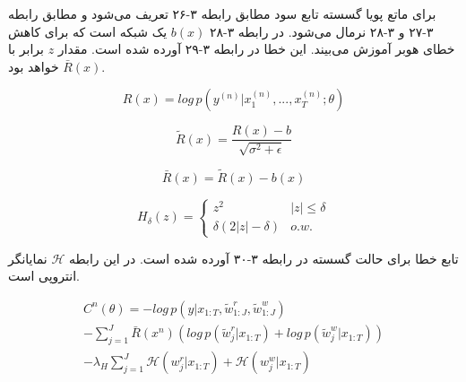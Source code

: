 برای ماتع پویا گسسته تابع سود مطابق رابطه ۳-۲۶ تعریف می‌شود و مطابق رابطه ۳-۲۷ و ۳-۲۸ نرمال می‌شود. در رابطه ۳-۲۸ $b(x)$ یک شبکه است که برای کاهش خطای هوبر آموزش می‌بیند. این خطا در رابطه ۳-۲۹ آورده شده است. مقدار $z$ برابر با $\bar{R}(x)$ خواهد بود.\cite{gulcehre2018dynamic}

\begin{equation}
R(x) = log\, p(y^{(n)}|x_1^{(n)},...,x_T^{(n)}; \theta)
\end{equation}

\begin{equation}
\tilde{R}(x) = \frac{R(x)-b}{\sqrt{\sigma^2+\epsilon}}
\end{equation}

\begin{equation}
\bar{R}(x) = \tilde{R}(x) - b(x)
\end{equation}

\begin{equation}
H_\delta(z) = \begin{cases}
z^2 &\text{$|z| \le \delta$} \\
\delta(2|z|-\delta) & \text{$o.w.$}
\end{cases}
\end{equation}

تابع خطا برای حالت گسسته در رابطه ۳-۳۰ آورده شده است. در این رابطه $\mathcal{H}$ نمایانگر انتروپی است.

\begin{multline}
C^n(\theta) = -log\,p(y|x_{1:T}, \tilde{w}^r_{1:J}, \tilde{w}^w_{1:J})\\
- {\sum_{j=1}^J{\bar{R}(x^n)(log\,p(\tilde{w}^r_j|x_{1:T})+log\,p(\tilde{w}^w_j|x_{1:T}))}}\\
- {\lambda_H \sum_{j=1}^J{\mathcal{H}(w_j^r|x_{1:T})+\mathcal{H}(w_j^w|x_{1:T})}}
\end{multline}